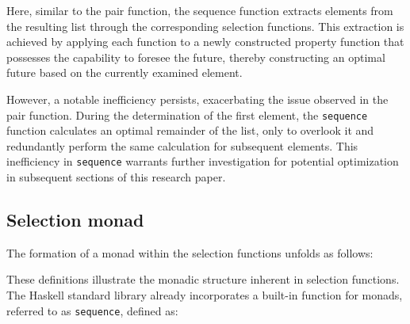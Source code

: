 \documentclass[runningheads]{llncs}
\begin{document}
Here, similar to the pair function, the sequence function extracts
elements from the resulting list through the corresponding selection
functions. This extraction is achieved by applying each function to a
newly constructed property function that possesses the capability to
foresee the future, thereby constructing an optimal future based on the
currently examined element.

However, a notable inefficiency persists, exacerbating the issue
observed in the pair function. During the determination of the first
element, the \texttt{sequence} function calculates an optimal remainder
of the list, only to overlook it and redundantly perform the same
calculation for subsequent elements. This inefficiency in
\texttt{sequence} warrants further investigation for potential
optimization in subsequent sections of this research paper.

\subsection{Selection monad}\label{selection-monad}

The formation of a monad within the selection functions unfolds as
follows:

\begin{Shaded}
\begin{Highlighting}[]
\OtherTok{(\textgreater{}\textgreater{}=) ::} \OtherTok{{-}\textgreater{}}\OtherTok{{-}\textgreater{}} \OtherTok{{-}\textgreater{}} 
\NormalTok{(}\OperatorTok{\textgreater{}\textgreater{}=}\OtherTok{=} 
\end{Highlighting}
\end{Shaded}

\begin{Shaded}
\begin{Highlighting}[]
\OtherTok{ ::}\OtherTok{{-}\textgreater{}} 
\OtherTok{=}
\end{Highlighting}
\end{Shaded}

These definitions illustrate the monadic structure inherent in selection
functions. The Haskell standard library already incorporates a built-in
function for monads, referred to as \texttt{sequence\textquotesingle{}},
defined as:
\end{document}
